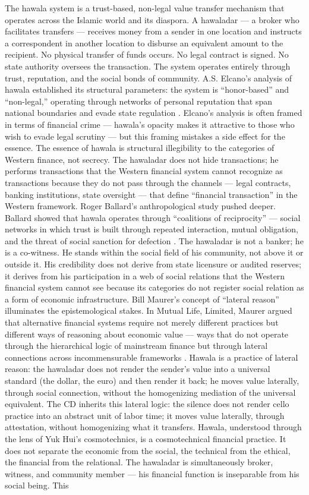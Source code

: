The hawala system is a trust-based, non-legal value transfer mechanism that operates across the Islamic world and its diaspora. A hawaladar — a broker who facilitates transfers — receives money from a sender in one location and instructs a correspondent in another location to disburse an equivalent amount to the recipient. No physical transfer of funds occurs. No legal contract is signed. No state authority oversees the transaction. The system operates entirely through trust, reputation, and the social bonds of community. A.S. Elcano’s analysis of hawala established its structural parameters: the system is “honor-based” and “non-legal,” operating through networks of personal reputation that span national boundaries and evade state regulation \cite{elcano_2004}. Elcano’s analysis is often framed in terms of financial crime — hawala’s opacity makes it attractive to those who wish to evade legal scrutiny — but this framing mistakes a side effect for the essence. The essence of hawala is structural illegibility to the categories of Western finance, not secrecy. The hawaladar does not hide transactions; he performs transactions that the Western financial system cannot recognize as transactions because they do not pass through the channels — legal contracts, banking institutions, state oversight — that define “financial transaction” in the Western framework. Roger Ballard’s anthropological study pushed deeper. Ballard showed that hawala operates through “coalitions of reciprocity” — social networks in which trust is built through repeated interaction, mutual obligation, and the threat of social sanction for defection \cite{ballard_2005}. The hawaladar is not a banker; he is a co-witness. He stands within the social field of his community, not above it or outside it. His credibility does not derive from state licensure or audited reserves; it derives from his participation in a web of social relations that the Western financial system cannot see because its categories do not register social relation as a form of economic infrastructure. Bill Maurer’s concept of “lateral reason” illuminates the epistemological stakes. In Mutual Life, Limited, Maurer argued that alternative financial systems require not merely different practices but different ways of reasoning about economic value — ways that do not operate through the hierarchical logic of mainstream finance but through lateral connections across incommensurable frameworks \cite{maurer_2005}. Hawala is a practice of lateral reason: the hawaladar does not render the sender’s value into a universal standard (the dollar, the euro) and then render it back; he moves value laterally, through social connection, without the homogenizing mediation of the universal equivalent. The CD inherits this lateral logic: the silence does not render cello practice into an abstract unit of labor time; it moves value laterally, through attestation, without homogenizing what it transfers. Hawala, understood through the lens of Yuk Hui’s cosmotechnics, is a cosmotechnical financial practice. It does not separate the economic from the social, the technical from the ethical, the financial from the relational. The hawaladar is simultaneously broker, witness, and community member — his financial function is inseparable from his social being. This 